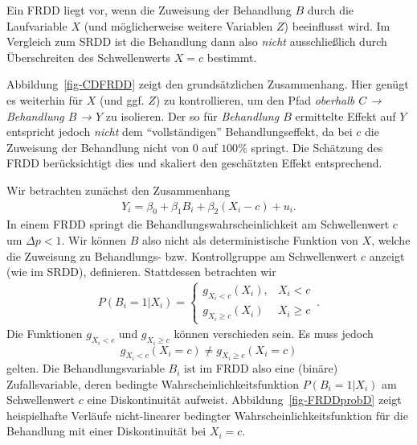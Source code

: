 \documentclass[
  a4paper,
  DIV=11,
  oneside]{scrreprt}
\begin{document}
Ein FRDD liegt vor, wenn die Zuweisung der Behandlung \(B\) durch die
Laufvariable \(X\) (und möglicherweise weitere Variablen \(Z\))
beeinflusst wird. Im Vergleich zum SRDD ist die Behandlung dann also
\emph{nicht} ausschließlich durch Überschreiten des Schwellenwerts
\(X = c\) bestimmt.

Abbildung~\ref{fig-CDFRDD} zeigt den grundsätzlichen Zusammenhang. Hier
genügt es weiterhin für \(X\) (und ggf. \(Z\)) zu kontrollieren, um den
Pfad \emph{oberhalb \(C\) → Behandlung \(B\) → \(Y\)} zu isolieren. Der
so für \emph{Behandlung \(B\)} ermittelte Effekt auf \(Y\) entspricht
jedoch \emph{nicht} dem ``vollständigen'' Behandlungseffekt, da bei
\(c\) die Zuweisung der Behandlung nicht von \(0\) auf \(100\%\)
springt. Die Schätzung des FRDD berücksichtigt dies und skaliert den
geschätzten Effekt entsprechend.

Wir betrachten zunächst den Zusammenhang \begin{align}
  Y_i = \beta_0 + \beta_1 B_i + \beta_2 (X_i - c) + u_i.\label{eq-simpleFRDD}
\end{align} In einem FRDD springt die Behandlungswahrscheinlichkeit am
Schwellenwert \(c\) um \(\Delta p<1\). Wir können \(B\) also nicht als
deterministische Funktion von \(X\), welche die Zuweisung zu
Behandlungs- bzw. Kontrollgruppe am Schwellenwert \(c\) anzeigt (wie im
SRDD), definieren. Stattdessen betrachten wir \begin{align}
  P(B_i=1\vert X_i) = 
  \begin{cases}
    g_{X_i<c}(X_i), & X_i < c \\ 
    g_{X_i\geq c}(X_i) & X_i \geq c
  \end{cases}\,. \label{eq-BFRDD}
\end{align} Die Funktionen \(g_{X_i<c}\) und \(g_{X_i\geq c}\) können
verschieden sein. Es muss jedoch
\[g_{X_i<c}(X_i = c) \neq g_{X_i\geq c}(X_i = c)\] gelten. Die
Behandlungsvariable \(B_i\) ist im FRDD also eine (binäre)
Zufallsvariable, deren bedingte Wahrscheinlichkeitsfunktion
\(P(B_i=1\vert X_i)\) am Schwellenwert \(c\) eine Diskontinuität
aufweist. Abbildung~\ref{fig-FRDDprobD} zeigt heispielhafte Verläufe
nicht-linearer bedingter Wahrscheinlichkeitsfunktion für die Behandlung
mit einer Diskontinuität bei \(X_i = c\).
\end{document}
